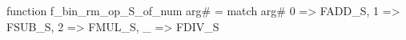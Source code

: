 function f_bin_rm_op_S_of_num arg# = match arg# {
  0 => FADD_S,
  1 => FSUB_S,
  2 => FMUL_S,
  _ => FDIV_S
}
